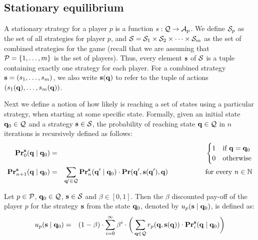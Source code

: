 \documentclass{article}
\begin{document}
\subsection{Stationary equilibrium}

A stationary strategy for a player $p$ is a function $s : \mathcal{Q} \rightarrow \mathcal{A}_p$. 
We define $\mathcal{S}_p$ as the set of all strategies for player $p$, and $\mathcal{S} = \mathcal{S}_{1} \times \mathcal{S}_{2} \times \cdots \times \mathcal{S}_{m}$ as the set of combined strategies for the game (recall that we are assuming that $\mathcal{P} = \{1, \ldots, m\}$ is the set of players). Thus, every element $\mathbf{s}$ of $\mathcal{S}$ is a tuple containing exactly one strategy for each player. 
For a combined strategy $\mathbf{s} = (s_1, \ldots, s_m)$, 
we also write $\mathbf{s}(\mathbf{q})$ to refer to the tuple of actions $(s_1(\mathbf{q}), \ldots, s_m(\mathbf{q}))$. 


Next we define a notion of how likely is reaching a set of states using a particular strategy, when starting at some specific state.
Formally, given an initial state $\mathbf{q}_0 \in \mathcal{Q}$ and a strategy $\mathbf{s} \in \mathcal{S}$, 
the probability of reaching state $\mathbf{q} \in \mathcal{Q}$ in $n$ iterations is recursively defined as follows:
\begin{eqnarray*}
\mathbf{Pr}_0^{\mathbf{s}}(\mathbf{q} \mid \mathbf{q}_0) & = &
\begin{cases}
1 & \text{if } \mathbf{q} = \mathbf{q}_0\\
0 & \text{otherwise}
\end{cases}\\
\mathbf{Pr}_{n+1}^{\mathbf{s}}(\mathbf{q} \mid \mathbf{q}_0) & = & \sum_{\mathbf{q}' \in \mathcal{Q}} \mathbf{Pr}_n^{\mathbf{s}}(\mathbf{q}'\mid \mathbf{q}_0) \cdot \mathbf{Pr}(\mathbf{q}', \mathbf{s}(\mathbf{q}'), \mathbf{q}) \quad \quad \quad  \quad \quad \text{ for every } n \in \mathbb{N}
\end{eqnarray*}


\begin{mydef}
Let $p \in \mathcal{P}$, $\mathbf{q}_0 \in \mathcal{Q}$, $\mathbf{s} \in \mathcal{S}$ and $\beta \in [0,1]$. Then the $\beta$ discounted pay-off of the player $p$ for the strategy $\mathbf{s}$ from the state $\mathbf{q}_0$, denoted by $u_p(\mathbf{s} \mid \mathbf{q}_0)$, is defined as:
\begin{eqnarray*}
u_p(\mathbf{s} \mid \mathbf{q}_0) & = & (1 - \beta) \cdot \sum_{i=0}^{\infty}\beta^{i} \cdot  \bigg(\sum_{\mathbf{q} \in \mathcal{Q}} r_p(\mathbf{q},\mathbf{s}(\mathbf{q})) \cdot 
\mathbf{Pr}_i^{\mathbf{s}}(\mathbf{q} \mid \mathbf{q}_0)\bigg)
\end{eqnarray*}
\end{mydef}

\end{document}
